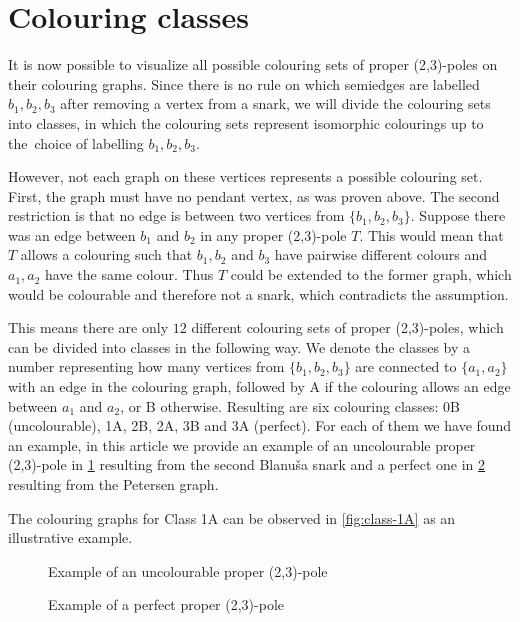 \section{Colouring classes}\label{sec:colouring-classes}

It is now possible to visualize all possible colouring sets of proper (2,3)-poles on their colouring graphs. Since there is no rule on which semiedges are labelled $b_1,b_2,b_3$ after removing a vertex from a snark, we will divide the colouring sets into classes, in which the colouring sets represent isomorphic colourings up to the~choice of labelling $b_1,b_2,b_3$.

However, not each graph on these vertices represents a possible colouring set. First, the graph must have no pendant vertex, as was proven above. The second restriction is that no edge is between two vertices from $\{b_1,b_2,b_3\}$. Suppose there was an edge between $b_1$ and $b_2$ in any proper (2,3)-pole $T$. This would mean that $T$ allows a colouring such that $b_1,b_2$ and $b_3$ have pairwise different colours and $a_1,a_2$ have the same colour. Thus $T$ could be extended to the former graph, which would be colourable and therefore not a snark, which contradicts the assumption.

This means there are only $12$ different colouring sets of proper (2,3)-poles, which can be divided into classes in the following way. We denote the classes by a number representing how many vertices from $\{b_1,b_2,b_3\}$ are connected to $\{a_1,a_2\}$ with an edge in the colouring graph, followed by A if the colouring allows an edge between $a_1$ and $a_2$, or B otherwise. Resulting are six colouring classes: 0B (uncolourable), 1A, 2B, 2A, 3B and 3A (perfect). For each of them we have found an example, in this article we provide an example of an uncolourable proper (2,3)-pole in \cref{fig:uncolourable-example} resulting from the second Blanuša snark and a perfect one in \cref{fig:perfect-example} resulting from the Petersen graph.

The colouring graphs for Class 1A can be observed in \cref{fig:class-1A} as an illustrative example.

\begin{figure}
	\centering
	\scalebox{0.7}{
		
	}
	\caption{Example of an uncolourable proper (2,3)-pole}
	\label{fig:uncolourable-example}
\end{figure}

\begin{figure}
	\centering
	
	\caption{Example of a perfect proper (2,3)-pole}
	\label{fig:perfect-example}
\end{figure}

